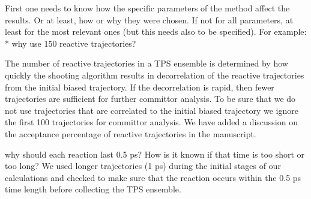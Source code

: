 \documentclass[journal=jpcbfk,manuscript=article,layout=traditional]{achemso}
\begin{document}
\begin{response}
{First one needs to know how the specific parameters of the method affect 
the results. Or at least, how or why they were chosen. If not for all parameters, 
at least for the most relevant ones (but this needs also to be specified). 
\newline
For example:
* why use 150 reactive trajectories?}

The number of reactive trajectories in a TPS ensemble is determined 
by how quickly the shooting algorithm results in decorrelation of 
the reactive trajectories from the initial biased trajectory. If the 
decorrelation is rapid, then fewer trajectories are sufficient for 
further committor analysis. To be sure that we do not use trajectories 
that are correlated to the initial biased trajectory we ignore the 
first 100 trajectories for committor analysis. We have added a discussion 
on the acceptance percentage of reactive trajectories in the manuscript. 

\end{response}

\begin{response}
  {why should each reaction last 0.5 ps? How is it known if that time is too short 
  or too long?}
We used longer trajectories (1 ps) during the initial stages of our calculations 
and checked to make sure that the reaction occurs within 
the 0.5 ps time length before collecting the TPS ensemble. 
\end{response}
\end{document}
